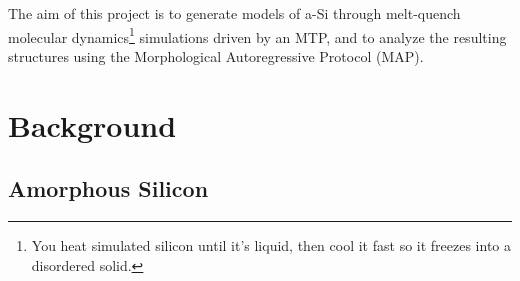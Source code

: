 \documentclass{article}
\begin{document}
The aim of this project is to generate models of a-Si through melt-quench molecular dynamics\footnote{You heat simulated silicon until it's liquid, then cool it fast so it freezes into a disordered solid.} simulations driven by an MTP, and to analyze the resulting structures using the Morphological Autoregressive Protocol (MAP).

\section{Background}

\subsection{Amorphous Silicon}
\end{document}
